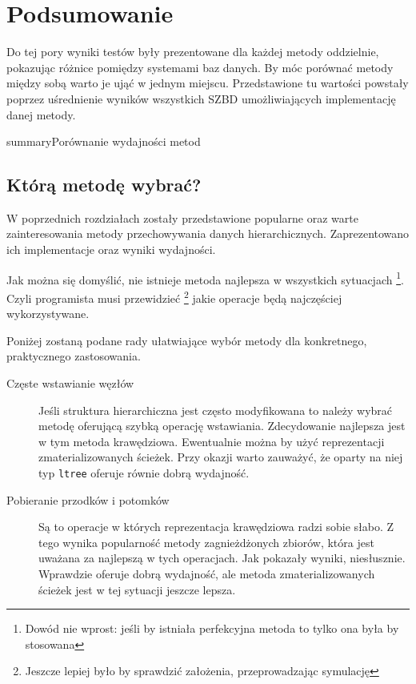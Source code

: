 \chapter{Podsumowanie}

Do tej pory wyniki testów były prezentowane dla każdej metody oddzielnie, pokazując różnice pomiędzy systemami baz danych.
By móc porównać metody między sobą warto je ująć w jednym miejscu.
Przedstawione tu wartości powstały poprzez uśrednienie wyników wszystkich SZBD umożliwiających implementację danej metody.


\begin{qxfig}{summary}{Porównanie wydajności metod}
\end{qxfig}



\section*{Którą metodę wybrać?}

W poprzednich rozdziałach zostały przedstawione popularne oraz warte zainteresowania metody przechowywania danych hierarchicznych.
Zaprezentowano ich implementacje oraz wyniki wydajności.


Jak można się domyślić, nie istnieje metoda najlepsza w wszystkich sytuacjach%
\footnote{Dowód nie wprost: jeśli by istniała perfekcyjna metoda to tylko ona była by stosowana}.
Czyli programista musi przewidzieć
\footnote{Jeszcze lepiej było by sprawdzić założenia, przeprowadzając symulację}
jakie operacje będą najczęściej wykorzystywane.


Poniżej zostaną podane rady ułatwiające wybór metody dla konkretnego, praktycznego zastosowania.

\begin{description}
	\item[Częste wstawianie węzłów]
		Jeśli struktura hierarchiczna jest często modyfikowana to należy wybrać metodę oferującą szybką operację wstawiania.
		Zdecydowanie najlepsza jest w tym metoda krawędziowa. 
		Ewentualnie można by użyć reprezentacji zmaterializowanych ścieżek.
		Przy okazji warto zauważyć, że oparty na niej typ \texttt{ltree} oferuje równie dobrą wydajność. 
		
	\item[Pobieranie przodków i potomków]
		Są to operacje w których reprezentacja krawędziowa radzi sobie słabo.
		Z tego wynika popularność metody zagnieżdżonych zbiorów, która jest uważana za najlepszą w tych operacjach.
		Jak pokazały wyniki, niesłusznie.
		Wprawdzie oferuje dobrą wydajność, ale metoda zmaterializowanych ścieżek jest w tej sytuacji jeszcze lepsza.
\end{description}

